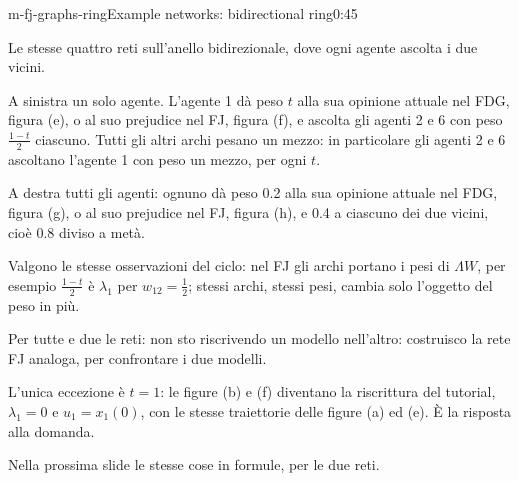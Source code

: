 \begin{slide}{m-fj-graphs-ring}{Example networks: bidirectional ring}{0:45}
  \begin{discorso}
    \item Le stesse quattro reti sull'anello bidirezionale, dove ogni agente ascolta i due vicini.
    \item A sinistra un solo agente. L'agente 1 dà peso $t$ alla sua opinione attuale nel FDG, figura (e), o al suo prejudice nel FJ, figura (f), e ascolta gli agenti 2 e 6 con peso $\frac{1-t}{2}$ ciascuno. Tutti gli altri archi pesano un mezzo: in particolare gli agenti 2 e 6 ascoltano l'agente 1 con peso un mezzo, per ogni $t$.
    \item A destra tutti gli agenti: ognuno dà peso 0.2 alla sua opinione attuale nel FDG, figura (g), o al suo prejudice nel FJ, figura (h), e 0.4 a ciascuno dei due vicini, cioè 0.8 diviso a metà.
    \item Valgono le stesse osservazioni del ciclo: nel FJ gli archi portano i pesi di $\Lambda W$, per esempio $\frac{1-t}{2}$ è $\lambda_1$ per $w_{12}=\frac12$; stessi archi, stessi pesi, cambia solo l'oggetto del peso in più.
    \item Per tutte e due le reti: non sto riscrivendo un modello nell'altro: costruisco la rete FJ analoga, per confrontare i due modelli.
    \item L'unica eccezione è $t=1$: le figure (b) e (f) diventano la riscrittura del tutorial, $\lambda_1=0$ e $u_1=x_1(0)$, con le stesse traiettorie delle figure (a) ed (e). È la risposta alla domanda.
    \item Nella prossima slide le stesse cose in formule, per le due reti.
  \end{discorso}
\end{slide}

